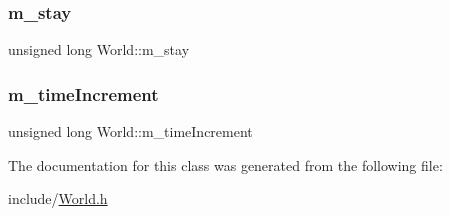 \subsubsection{\texorpdfstring{m\_stay}{m\_stay}}
{\footnotesize\ttfamily unsigned long World\+::m\+\_\+stay\hspace{0.3cm}{\ttfamily [private]}}

\mbox{\label{class_world_a97f773548fef49eb408115c097aa995d}} 
\subsubsection{\texorpdfstring{m\_timeIncrement}{m\_timeIncrement}}
{\footnotesize\ttfamily unsigned long World\+::m\+\_\+time\+Increment\hspace{0.3cm}{\ttfamily [private]}}



The documentation for this class was generated from the following file\+:\begin{DoxyCompactItemize}
\item 
include/\mbox{\hyperlink{_world_8h}{World.\+h}}\end{DoxyCompactItemize}
